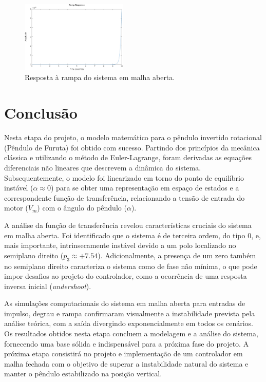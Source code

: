 \documentclass[9pt,a4paper,twocolumn,twoside]{tau-class/tau}
\begin{document}
\begin{figure}[H]
    \centering
    \includegraphics[width=0.45\textwidth]{figures/ramp_response.png}
    \caption{Resposta à rampa do sistema em malha aberta.}
    \label{fig:ramp}
\end{figure}

\section{Conclusão}
Nesta etapa do projeto, o modelo matemático para o pêndulo invertido rotacional (Pêndulo de Furuta) foi obtido com sucesso. Partindo dos princípios da mecânica clássica e utilizando o método de Euler-Lagrange, foram derivadas as equações diferenciais não lineares que descrevem a dinâmica do sistema. Subsequentemente, o modelo foi linearizado em torno do ponto de equilíbrio instável (\(\alpha \approx 0\)) para se obter uma representação em espaço de estados e a correspondente função de transferência, relacionando a tensão de entrada do motor (\(V_m\)) com o ângulo do pêndulo (\(\alpha\)).

A análise da função de transferência revelou características cruciais do sistema em malha aberta. Foi identificado que o sistema é de terceira ordem, do tipo 0, e, mais importante, intrinsecamente instável devido a um polo localizado no semiplano direito (\(p_3 \approx +7.54\)). Adicionalmente, a presença de um zero também no semiplano direito caracteriza o sistema como de fase não mínima, o que pode impor desafios ao projeto do controlador, como a ocorrência de uma resposta inversa inicial (\textit{undershoot}).

As simulações computacionais do sistema em malha aberta para entradas de impulso, degrau e rampa confirmaram visualmente a instabilidade prevista pela análise teórica, com a saída divergindo exponencialmente em todos os cenários. Os resultados obtidos nesta etapa concluem a modelagem e a análise do sistema, fornecendo uma base sólida e indispensável para a próxima fase do projeto. A próxima etapa consistirá no projeto e implementação de um controlador em malha fechada com o objetivo de superar a instabilidade natural do sistema e manter o pêndulo estabilizado na posição vertical.
\end{document}
